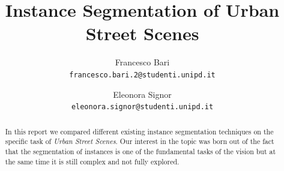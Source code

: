 \documentclass[10pt,twocolumn,letterpaper]{article}
\begin{document}
\title{Instance Segmentation of Urban Street Scenes}

\author{Francesco Bari\\
{\tt\small francesco.bari.2@studenti.unipd.it}
\and
Eleonora Signor\\
{\tt\small eleonora.signor@studenti.unipd.it}
}

\maketitle

\begin{abstract}
In this report we compared different existing instance segmentation techniques on the specific task of \textit{Urban Street Scenes}. Our interest in the topic was born out of the fact that the segmentation of instances is one of the fundamental tasks of the vision but at the same time it is still complex and not fully explored.
\end{abstract}

\end{document}
